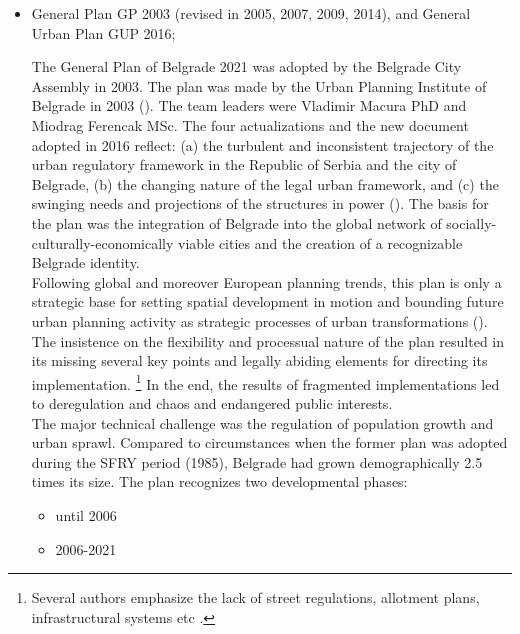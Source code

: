 \documentclass[11pt]{report}
\begin{document}
\begin{itemize}
\item General Plan GP 2003 (revised in 2005, 2007, 2009, 2014), and General Urban Plan GUP 2016;

The  General  Plan  of  Belgrade  2021 was adopted  by the Belgrade  City Assembly in 2003.
The plan was made by  the  Urban  Planning  Institute  of  Belgrade  in  2003 (\cite{ref Official Gazette of the City of Belgrade no 27/03}). The team leaders were Vladimir Macura PhD and Miodrag Ferencak MSc. The four actualizations and the new document adopted in 2016 reflect: (a) the turbulent and inconsistent trajectory of the urban regulatory framework in the Republic of Serbia and the city of Belgrade, (b) the changing nature of the legal urban framework, and (c) the swinging needs and projections of the structures in power 
(\href{Vukmirovic}{\citealt{doytchinov_belgrade:_2015}}).
The basis for the plan was the integration of Belgrade into the global network of socially-culturally-economically viable cities and the creation of a recognizable Belgrade identity.
\\

Following global and moreover European planning trends, this plan is only a  strategic base for setting spatial development in motion and bounding future urban planning activity as strategic processes of urban transformations (\href{Grozdanic}{\citealt{grozdanic_belgrade_2008}}).
The insistence on the flexibility and processual nature of the plan resulted in its missing several key points and legally abiding elements for directing its implementation.
\footnote{Several authors emphasize the lack of street regulations,  allotment plans, infrastructural systems etc \cite{ref}.}
In the end, the results of fragmented implementations led to deregulation and chaos and endangered public interests.
\\
The major technical challenge was the regulation of population growth and urban sprawl. Compared to circumstances when the former plan was adopted during the SFRY period (1985), Belgrade had grown demographically 2.5 times its size.
The plan recognizes two developmental phases:

\begin{itemize}
\item until 2006
\item 2006-2021
\end{itemize}


\end{itemize}
\end{document}
